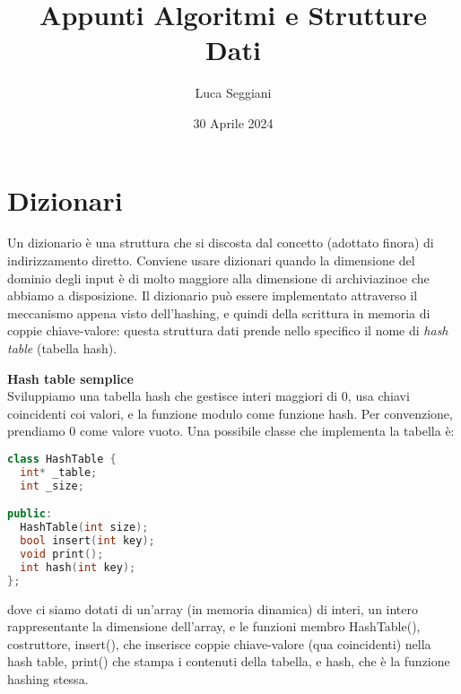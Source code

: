 \documentclass[a4paper,12pt]{article}
\title{Appunti Algoritmi e Strutture Dati}
\author{Luca Seggiani}
\date{30 Aprile 2024}
\begin{document}
\maketitle
\section{Dizionari}
Un dizionario è una struttura che si discosta dal concetto (adottato finora) di indirizzamento diretto. Conviene usare
dizionari quando la dimensione del dominio degli input è di molto maggiore alla dimensione di archiviazinoe
che abbiamo a disposizione. Il dizionario può essere implementato attraverso il meccanismo appena visto dell'hashing, e quindi della scrittura in memoria
di coppie chiave-valore: questa struttura dati prende nello specifico il nome di \textit{hash table} (tabella hash).
\par\smallskip
\textbf{Hash table semplice} \\
Sviluppiamo una tabella hash che gestisce interi maggiori di 0, usa chiavi coincidenti coi valori, e la funzione modulo come funzione hash.
Per convenzione, prendiamo 0 come valore vuoto. Una possibile classe che implementa la tabella è:
\begin{lstlisting}[language=C++]
class HashTable {
  int* _table;
  int _size;

public:
  HashTable(int size);
  bool insert(int key);
  void print();
  int hash(int key);
};
\end{lstlisting}
dove ci siamo dotati di un'array (in memoria dinamica) di interi, un intero rappresentante la dimensione dell'array, e
le funzioni membro HashTable(), costruttore, insert(), che inserisce coppie chiave-valore (qua coincidenti) nella hash table, print() che stampa i contenuti
della tabella, e hash, che è la funzione hashing stessa.
\end{document}
